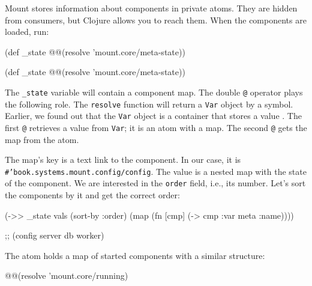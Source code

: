 Mount stores information about components in private atoms. They are hidden from consumers, but Clojure allows you to reach them. When the components are loaded, run:

\ifnarrow

\begin{english}
  \begin{clojure}
(def _state
  @@(resolve 'mount.core/meta-state))
  \end{clojure}
\end{english}

\else

\begin{english}
  \begin{clojure}
(def _state @@(resolve 'mount.core/meta-state))
  \end{clojure}
\end{english}

\fi


The \verb|_state| variable will contain a component map. The double \verb|@| operator plays the following role. The \verb|resolve| function will return a \verb|Var| object by a symbol. Earlier, we found out that the \verb|Var| object is a container that stores a value . The first \verb|@| retrieves a value from \verb|Var|; it is an atom with a map. The second \verb|@| gets the map from the atom.

The map's key is a text link to the component. In our case, it is \texttt{\#'book.systems.mount\-.config/config}. The value is a nested map with the state of the component. We are interested in the \verb|order| field, i.e., its number. Let's sort the components by it and get the correct order:

\begin{english}
  \begin{clojure}
(->> _state
     vals (sort-by :order)
     (map (fn [cmp]
            (-> cmp :var meta :name))))

;; (config server db worker)
  \end{clojure}
\end{english}

The  atom holds a map of started components with a similar structure:

\begin{english}
  \begin{clojure}
@@(resolve 'mount.core/running)
  \end{clojure}
\end{english}

